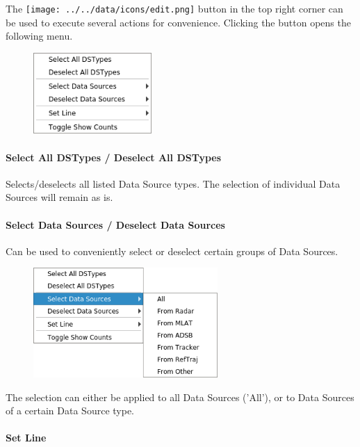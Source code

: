 The \texttt{[image: ../../data/icons/edit.png]} button in the top right corner can be used to execute several actions for convenience.
Clicking the button opens the following menu.

\begin{figure}[H]
    \center
    \includegraphics[width=4.5cm,frame]{figures/ui_data_source_configmenu.png}
\end{figure}

\paragraph{Select All DSTypes / Deselect All DSTypes}

Selects/deselects all listed Data Source types. The selection of individual Data Sources will remain as is.

\paragraph{Select Data Sources / Deselect Data Sources}

Can be used to conveniently select or deselect certain groups of Data Sources.

\begin{figure}[H]
    \center
    \includegraphics[width=7cm,frame]{figures/ui_data_source_configmenu_select.png}
\end{figure}

The selection can either be applied to all Data Sources ('All'), or to Data Sources of a certain Data Source type. 

\paragraph{Set Line}

